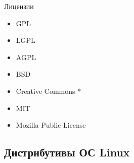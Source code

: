 \documentclass[ignorenonframetext, professionalfonts, hyperref={pdftex, unicode}]{beamer}
\begin{document}
\begin{frame}{Лицензии}
	\begin{itemize}
		\item GPL
		\item LGPL
		\item AGPL
		\item BSD
		\item Creative Commons *
		\item MIT
		\item Mozilla Public License
	\end{itemize}
\end{frame}




\subsection{Дистрибутивы ОС Linux}
\end{document}
